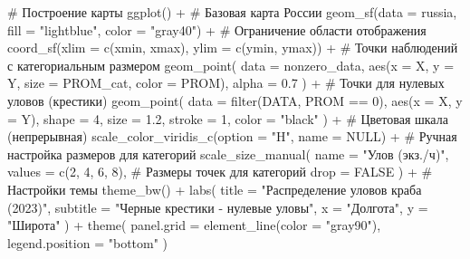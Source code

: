 \documentclass[
  letterpaper,
  DIV=11,
  numbers=noendperiod]{scrreprt}
\newenvironment{Shaded}{\begin{snugshade}}{\end{snugshade}}
\newcommand{\AttributeTok}[1]{\textcolor[rgb]{0.40,0.45,0.13}{#1}}
\newcommand{\CommentTok}[1]{\textcolor[rgb]{0.37,0.37,0.37}{#1}}
\newcommand{\ConstantTok}[1]{\textcolor[rgb]{0.56,0.35,0.01}{#1}}
\newcommand{\DecValTok}[1]{\textcolor[rgb]{0.68,0.00,0.00}{#1}}
\newcommand{\FloatTok}[1]{\textcolor[rgb]{0.68,0.00,0.00}{#1}}
\newcommand{\FunctionTok}[1]{\textcolor[rgb]{0.28,0.35,0.67}{#1}}
\newcommand{\NormalTok}[1]{\textcolor[rgb]{0.00,0.23,0.31}{#1}}
\newcommand{\SpecialCharTok}[1]{\textcolor[rgb]{0.37,0.37,0.37}{#1}}
\newcommand{\StringTok}[1]{\textcolor[rgb]{0.13,0.47,0.30}{#1}}
\begin{document}
\begin{Shaded}
\begin{Highlighting}[]
\CommentTok{\# Построение карты}
\FunctionTok{ggplot}\NormalTok{() }\SpecialCharTok{+}
  \CommentTok{\# Базовая карта России}
  \FunctionTok{geom\_sf}\NormalTok{(}\AttributeTok{data =}\NormalTok{ russia, }\AttributeTok{fill =} \StringTok{"lightblue"}\NormalTok{, }\AttributeTok{color =} \StringTok{"gray40"}\NormalTok{) }\SpecialCharTok{+} 
  \CommentTok{\# Ограничение области отображения}
  \FunctionTok{coord\_sf}\NormalTok{(}\AttributeTok{xlim =} \FunctionTok{c}\NormalTok{(xmin, xmax), }\AttributeTok{ylim =} \FunctionTok{c}\NormalTok{(ymin, ymax)) }\SpecialCharTok{+}
  \CommentTok{\# Точки наблюдений с категориальным размером}
  \FunctionTok{geom\_point}\NormalTok{(}
    \AttributeTok{data =}\NormalTok{ nonzero\_data,}
    \FunctionTok{aes}\NormalTok{(}\AttributeTok{x =}\NormalTok{ X, }\AttributeTok{y =}\NormalTok{ Y, }\AttributeTok{size =}\NormalTok{ PROM\_cat, }\AttributeTok{color =}\NormalTok{ PROM),}
    \AttributeTok{alpha =} \FloatTok{0.7}
\NormalTok{  ) }\SpecialCharTok{+}
  \CommentTok{\# Точки для нулевых уловов (крестики)}
  \FunctionTok{geom\_point}\NormalTok{(}
    \AttributeTok{data =} \FunctionTok{filter}\NormalTok{(DATA, PROM }\SpecialCharTok{==} \DecValTok{0}\NormalTok{),}
    \FunctionTok{aes}\NormalTok{(}\AttributeTok{x =}\NormalTok{ X, }\AttributeTok{y =}\NormalTok{ Y),}
    \AttributeTok{shape =} \DecValTok{4}\NormalTok{, }\AttributeTok{size =} \FloatTok{1.2}\NormalTok{, }\AttributeTok{stroke =} \DecValTok{1}\NormalTok{, }\AttributeTok{color =} \StringTok{"black"}
\NormalTok{  ) }\SpecialCharTok{+}
  \CommentTok{\# Цветовая шкала (непрерывная)}
  \FunctionTok{scale\_color\_viridis\_c}\NormalTok{(}\AttributeTok{option =} \StringTok{"H"}\NormalTok{, }\AttributeTok{name =} \ConstantTok{NULL}\NormalTok{) }\SpecialCharTok{+}
  \CommentTok{\# Ручная настройка размеров для категорий}
  \FunctionTok{scale\_size\_manual}\NormalTok{(}
    \AttributeTok{name =} \StringTok{"Улов (экз./ч)"}\NormalTok{,}
    \AttributeTok{values =} \FunctionTok{c}\NormalTok{(}\DecValTok{2}\NormalTok{, }\DecValTok{4}\NormalTok{, }\DecValTok{6}\NormalTok{, }\DecValTok{8}\NormalTok{),  }\CommentTok{\# Размеры точек для категорий}
    \AttributeTok{drop =} \ConstantTok{FALSE}
\NormalTok{  ) }\SpecialCharTok{+}
  \CommentTok{\# Настройки темы}
  \FunctionTok{theme\_bw}\NormalTok{() }\SpecialCharTok{+}
  \FunctionTok{labs}\NormalTok{(}
    \AttributeTok{title =} \StringTok{"Распределение уловов краба (2023)"}\NormalTok{,}
    \AttributeTok{subtitle =} \StringTok{"Черные крестики {-} нулевые уловы"}\NormalTok{,}
    \AttributeTok{x =} \StringTok{"Долгота"}\NormalTok{, }
    \AttributeTok{y =} \StringTok{"Широта"}
\NormalTok{  ) }\SpecialCharTok{+}
  \FunctionTok{theme}\NormalTok{(}
    \AttributeTok{panel.grid =} \FunctionTok{element\_line}\NormalTok{(}\AttributeTok{color =} \StringTok{"gray90"}\NormalTok{),}
    \AttributeTok{legend.position =} \StringTok{"bottom"}
\NormalTok{  )}
\end{Highlighting}
\end{Shaded}
\end{document}
